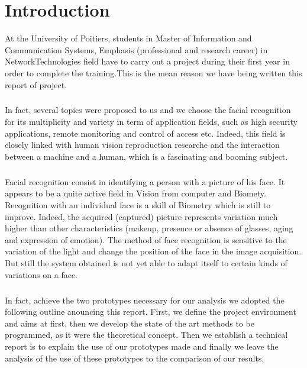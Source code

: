 \chapter*{Introduction}

At the University of Poitiers, students in Master of Information and Communication Systems, Emphasis  (professional and research career) in NetworkTechnologies field have to carry out a project during their first year in order to complete the training.This is the mean reason we have being written this report of project.   
\paragraph{}
In fact, several topics were proposed to us and we choose the facial recognition for its multiplicity and variety in term of application fields, such as high security applications, remote monitoring and control of access etc. Indeed, this field is closely linked with human vision reproduction researche and the interaction between a machine and a human, which is a fascinating and booming subject.
\paragraph{}
Facial recognition consist in identifying a person with a picture of his face. It appears to be a quite active field in Vision from computer and Biomety. Recognition with an individual face is a skill of Biometry which is still to improve. Indeed, the acquired (captured) picture represents variation much higher than other characteristics (makeup, presence or absence of glasses, aging and expression of emotion). The method of face recognition is sensitive to the variation of the light and change the position of the face in the image acquisition. But still the system obtained is not yet able to adapt itself to certain kinds of variations on a face.
\paragraph{}
In fact, achieve the two prototypes necessary for our analysis we adopted the following outline anouncing this report. First, we define the project environment and aims at first, then we develop the state of the art methods to be programmed, as it were the theoretical concept. Then we establish a technical report is to explain the use of our prototypes made and finally we leave the analysis of the use of these prototypes to the comparison of our results.
